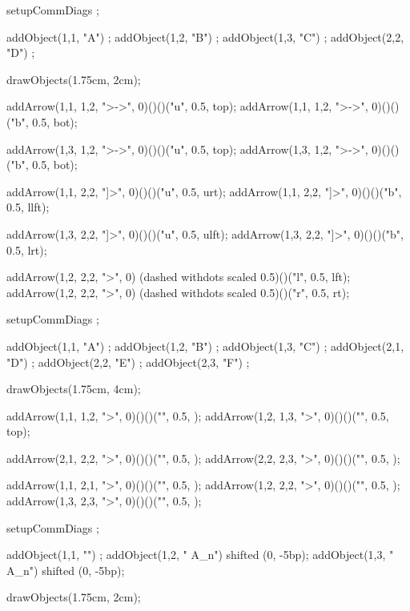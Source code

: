 \startbuffer
\startformula{}
  setupCommDiags ;
  
  addObject(1,1, "A") ;
  addObject(1,2, "B") ;
  addObject(1,3, "C") ;
  addObject(2,2, "D") ;
  
  drawObjects(1.75cm, 2cm);
  
  addArrow(1,1, 1,2, ">->", 0)()()("u", 0.5, top);
  addArrow(1,1, 1,2, ">->", 0)()()("b", 0.5, bot);

  addArrow(1,3, 1,2, ">->", 0)()()("u", 0.5, top);
  addArrow(1,3, 1,2, ">->", 0)()()("b", 0.5, bot);
  
  addArrow(1,1, 2,2, "]>",  0)()()("u", 0.5, urt);
  addArrow(1,1, 2,2, "]>",  0)()()("b", 0.5, llft);
  
  addArrow(1,3, 2,2, "]>",  0)()()("u", 0.5, ulft);
  addArrow(1,3, 2,2, "]>",  0)()()("b", 0.5, lrt);

  addArrow(1,2, 2,2, ">",   0)
    (dashed withdots scaled 0.5)()("l", 0.5, lft);
  addArrow(1,2, 2,2, ">",   0)
    (dashed withdots scaled 0.5)()("r", 0.5, rt);
\stopMPcode\stopformula
\stopbuffer

\processTEXbuffer

\typebuffer

\startbuffer
\startformula{}
  setupCommDiags ;
  
  addObject(1,1, "A") ;
  addObject(1,2, "B") ;
  addObject(1,3, "C") ;
  addObject(2,1, "D") ;
  addObject(2,2, "E") ;
  addObject(2,3, "F") ;
  
  drawObjects(1.75cm, 4cm);
  
  addArrow(1,1, 1,2, ">", 0)()()("", 0.5, );
  addArrow(1,2, 1,3, ">", 0)()()("", 0.5, top);
  
  addArrow(2,1, 2,2, ">", 0)()()("", 0.5, );
  addArrow(2,2, 2,3, ">", 0)()()("", 0.5, );
  
  addArrow(1,1, 2,1, ">", 0)()()("", 0.5, );
  addArrow(1,2, 2,2, ">", 0)()()("", 0.5, );
  addArrow(1,3, 2,3, ">", 0)()()("", 0.5, );
\stopMPcode\stopformula
\stopbuffer

\processTEXbuffer

\typebuffer

\startbuffer
\startformula{}
  setupCommDiags ;
  
  addObject(1,1, "") ;
  addObject(1,2, " A_n") shifted (0, -5bp);
  addObject(1,3, " A_n") shifted (0, -5bp);
  
  drawObjects(1.75cm, 2cm);
  

